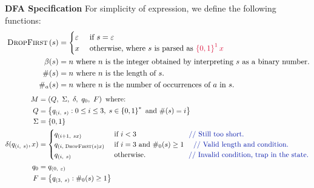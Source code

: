 \begin{Answer}
  \step
  \textbf{DFA Specification}
  \step
  For simplicity of expression, we define the following functions:
  \begin{align*}
    \shift{s} &= \begin{cases}
      \eps &\text{ if } s = \eps\\
      x &\text{ otherwise, where } s \text{ is parsed as } \crim{\set{0, 1}^1x} \\
    \end{cases} \\
    \beta(s) &= n \text{ where $n$ is the integer obtained by interpreting $s$ as a binary number.} \\
    \#(s) &= n \text{ where $n$ is the length of $s$.} \\
    \#_a(s) &= n \text{ where $n$ is the number of occurrences of $a$ in $s$.}
  \end{align*}
  \begin{align*}
    M &= \left( Q,\ \Sigma,\ \delta,\ q_0,\ F \right) \text{ where: }\\
    Q &= \set{ q_{(i,\ s)} : 0 \leq i \le 3,\; s \in \set{0, 1}^* \text{ and } \#(s) = i} \\
    \Sigma &= \set{0, 1} \\
    \delta(q_{(i,\ s)}, x) &= \begin{cases}
      q_{(i+1,\ sx)} &\text{ if } i < 3 \quad \quad \quad \quad \quad \quad \quad \zaff{\text{ // Still too short.}}\\
      q_{(i, \shift{s}x)} &\text{ if $i = 3$ and } \#_0(s) \ge 1 \quad \zaff{\text{ // Valid length and condition.}}\\
      q_{(i,\ s)} &\text{ otherwise.} \quad \quad \quad \quad \quad \quad \zaff{\text{// Invalid condition, trap in the state.}}
    \end{cases} \\
    q_0 &= q_{(0,\ \eps)} \\
    F &= \set{ q_{(3,\ s)} : \#_0(s) \ge 1}
  \end{align*}
\end{Answer}
